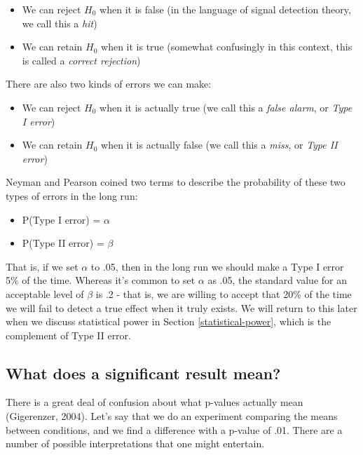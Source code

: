 \documentclass[12pt,]{book}
\providecommand{\tightlist}{%
  \setlength{\itemsep}{0pt}\setlength{\parskip}{0pt}}
\theoremstyle{definition}
\theoremstyle{definition}
\theoremstyle{definition}
\theoremstyle{remark}
\begin{document}
\begin{itemize}
\tightlist
\item
  We can reject \(H_0\) when it is false (in the language of signal detection theory, we call this a \emph{hit})
\item
  We can retain \(H_0\) when it is true (somewhat confusingly in this context, this is called a \emph{correct rejection})
\end{itemize}

There are also two kinds of errors we can make:

\begin{itemize}
\tightlist
\item
  We can reject \(H_0\) when it is actually true (we call this a \emph{false alarm}, or \emph{Type I error})
\item
  We can retain \(H_0\) when it is actually false (we call this a \emph{miss}, or \emph{Type II error})
\end{itemize}

Neyman and Pearson coined two terms to describe the probability of these two types of errors in the long run:

\begin{itemize}
\tightlist
\item
  P(Type I error) = \(\alpha\)
\item
  P(Type II error) = \(\beta\)
\end{itemize}

That is, if we set \(\alpha\) to .05, then in the long run we should make a Type I error 5\% of the time. Whereas it's common to set \(\alpha\) as .05, the standard value for an acceptable level of \(\beta\) is .2 - that is, we are willing to accept that 20\% of the time we will fail to detect a true effect when it truly exists. We will return to this later when we discuss statistical power in Section \ref{statistical-power}, which is the complement of Type II error.

\hypertarget{what-does-a-significant-result-mean}{%
\subsection{What does a significant result mean?}\label{what-does-a-significant-result-mean}}

There is a great deal of confusion about what p-values actually mean (Gigerenzer, 2004). Let's say that we do an experiment comparing the means between conditions, and we find a difference with a p-value of .01. There are a number of possible interpretations that one might entertain.
\end{document}
